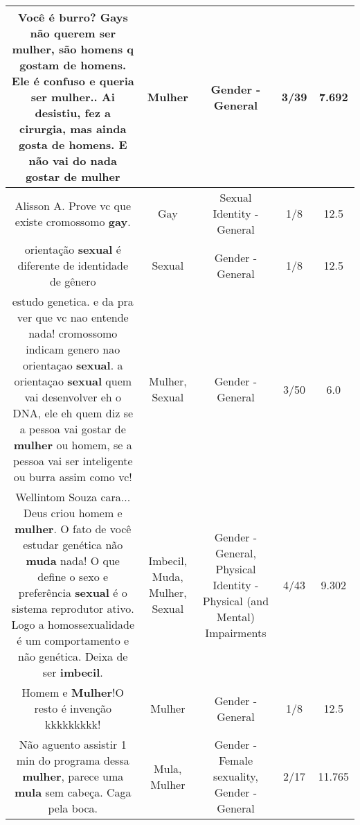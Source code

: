 \documentclass[11pt]{article}
\newlength\mylength
\begin{document}
\begin{center}
\begin{longtable}{|C{.65\mylength}|C{.30\mylength}|C{.12\mylength}|C{.12\mylength}|C{.12\mylength}|}
  \small Você é burro?  Gays não querem ser \textbf{mulher}, são homens q gostam de homens. Ele é confuso e queria ser \textbf{mulher}.. Ai desistiu, fez a cirurgia, mas ainda gosta de homens. E não vai do nada gostar de mulher\normalsize   & Mulher & Gender - General & 3/39 & 7.692 \\  \hline
  \small Alisson A. Prove vc que existe cromossomo \textbf{gay}.\normalsize   & Gay & Sexual Identity - General & 1/8 & 12.5 \\  \hline
  \small orientação \textbf{sexual} é diferente de identidade de gênero\normalsize   & Sexual & Gender - General & 1/8 & 12.5 \\  \hline
  \small estudo genetica. e da pra ver que vc nao entende nada! cromossomo indicam genero nao orientaçao \textbf{sexual}. a orientaçao \textbf{sexual} quem vai desenvolver eh o DNA, ele eh quem diz se a pessoa vai gostar de \textbf{mulher} ou homem, se a pessoa vai ser inteligente ou burra assim como vc!\normalsize   & Mulher, Sexual & Gender - General & 3/50 & 6.0 \\  \hline
  \small Wellintom  Souza cara... Deus criou homem e \textbf{mulher}. O fato de você estudar genética não \textbf{muda} nada! O que define o sexo e preferência \textbf{sexual} é o sistema reprodutor ativo. Logo a homossexualidade é um comportamento e não genética. Deixa de ser \textbf{imbecil}.\normalsize   & Imbecil, Muda, Mulher, Sexual & Gender - General, Physical Identity - Physical (and Mental) Impairments & 4/43 & 9.302 \\  \hline
  \small Homem e \textbf{Mulher}!O resto é invenção kkkkkkkkk!\normalsize   & Mulher & Gender - General & 1/8 & 12.5 \\  \hline
  \small Não aguento assistir 1 min do programa dessa \textbf{mulher}, parece uma \textbf{mula} sem cabeça. Caga pela boca.\normalsize   & Mula, Mulher & Gender - Female sexuality, Gender - General & 2/17 & 11.765 \\  \hline

\end{longtable}
\end{center}
\end{document}
